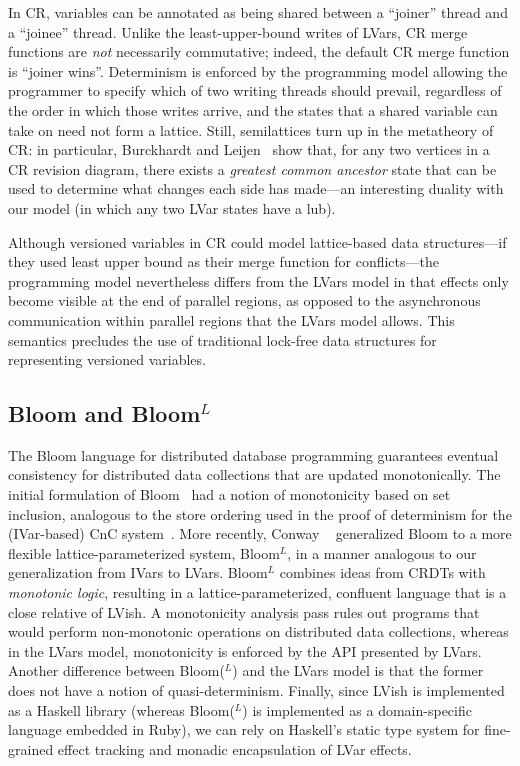In CR, variables can be annotated as being shared between a ``joiner''
thread and a ``joinee'' thread.  Unlike the least-upper-bound writes
of LVars, CR merge functions are \emph{not} necessarily commutative;
indeed, the default CR merge function is ``joiner wins''.  Determinism
is enforced by the programming model allowing the programmer to
specify which of two writing threads should prevail, regardless of the
order in which those writes arrive, and the states that a shared
variable can take on need not form a lattice.  Still, semilattices
turn up in the metatheory of CR: in particular, Burckhardt and
Leijen~\cite{semantics-concurrent-revisions} show that, for any two
vertices in a CR revision diagram, there exists a \emph{greatest
  common ancestor} state that can be used to determine what changes
each side has made---an interesting duality with our model (in which
any two LVar states have a lub).

Although versioned variables in CR could model lattice-based data
structures---if they used least upper bound as their merge function
for conflicts---the programming model nevertheless differs from the
LVars model in that effects only become visible at the end of parallel
regions, as opposed to the asynchronous communication within parallel
regions that the LVars model allows.  This semantics precludes the use
of traditional lock-free data structures for representing versioned
variables.

\subsection{Bloom and Bloom$^L$}

The Bloom language for distributed database programming guarantees
eventual consistency for distributed data collections that are updated
monotonically.  The initial formulation of Bloom~\cite{bloom-cidr} had
a notion of monotonicity based on set inclusion, analogous to the
store ordering used in the proof of determinism for the (IVar-based)
CnC system~\cite{CnC}.  More recently, Conway \etal~\cite{blooml}
generalized Bloom to a more flexible lattice-parameterized system,
Bloom$^L$, in a manner analogous to our generalization from IVars to
LVars.  Bloom$^L$ combines ideas from CRDTs with \emph{monotonic
  logic}, resulting in a lattice-parameterized, confluent language
that is a close relative of LVish.  A monotonicity analysis pass rules
out programs that would perform non-monotonic operations on
distributed data collections, whereas in the LVars model, monotonicity
is enforced by the API presented by LVars.  Another difference between
Bloom($^L$) and the LVars model is that the former does not have a
notion of quasi-determinism.  Finally, since LVish is
implemented as a Haskell library (whereas Bloom($^L$) is implemented
as a domain-specific language embedded in Ruby), we can rely on
Haskell's static type system for fine-grained effect tracking and
monadic encapsulation of LVar effects.

